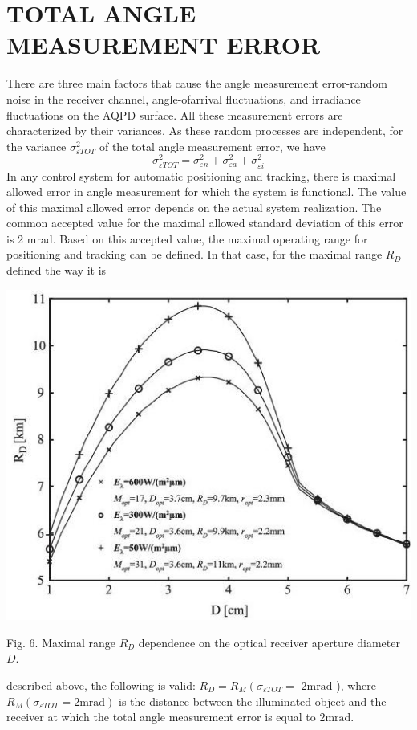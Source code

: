 \documentclass[10pt]{article}
\begin{document}
\section{TOTAL ANGLE MEASUREMENT ERROR}
There are three main factors that cause the angle measurement error-random noise in the receiver channel, angle-ofarrival fluctuations, and irradiance fluctuations on the AQPD surface. All these measurement errors are characterized by their variances. As these random processes are independent, for the variance \(\sigma_{\varepsilon T O T}^{2}\) of the total angle measurement error, we have
\[
\sigma_{\varepsilon T O T}^{2}=\sigma_{\varepsilon n}^{2}+\sigma_{\varepsilon a}^{2}+\sigma_{\varepsilon i}^{2}
\]
In any control system for automatic positioning and tracking, there is maximal allowed error in angle measurement for which the system is functional. The value of this maximal allowed error depends on the actual system realization. The common accepted value for the maximal allowed standard deviation of this error is 2 mrad. Based on this accepted value, the maximal operating range for positioning and tracking can be defined. In that case, for the maximal range \(R_{D}\) defined the way it is

\includegraphics[max width=\textwidth]{5ecfdecb1168916efbeaf9054b715324-09}

Fig. 6. Maximal range \(R_{D}\) dependence on the optical receiver aperture diameter \(D\).

described above, the following is valid: \(R_{D}=R_{M}\left(\sigma_{\varepsilon T O T}=\right.\) \(2 \mathrm{mrad}\) ), where \(R_{M}\left(\sigma_{\varepsilon T O T}=2 \mathrm{mrad}\right)\) is the distance between the illuminated object and the receiver at which the total angle measurement error is equal to \(2 \mathrm{mrad}\).
\end{document}
